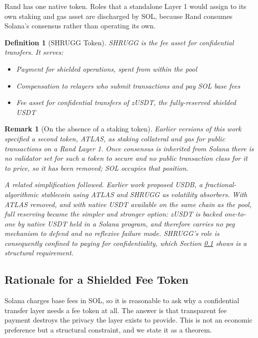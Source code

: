 \documentclass[11pt,a4paper]{article}
\newtheorem{definition}[theorem]{Definition}
\newtheorem{remark}[theorem]{Remark}
\begin{document}
Rand has one native token. Roles that a standalone Layer 1 would assign to its own staking and gas asset are discharged by SOL, because Rand consumes Solana's consensus rather than operating its own.

\begin{definition}[SHRUGG Token]
SHRUGG is the fee asset for confidential transfers. It serves:
\begin{itemize}
    \item Payment for shielded operations, spent from within the pool
    \item Compensation to relayers who submit transactions and pay SOL base fees
    \item Fee asset for confidential transfers of zUSDT, the fully-reserved shielded USDT \cite{zUSDTPaper}
\end{itemize}
\end{definition}

\begin{remark}[On the absence of a staking token]
Earlier versions of this work specified a second token, ATLAS, as staking collateral and gas for public transactions on a Rand Layer 1. Once consensus is inherited from Solana there is no validator set for such a token to secure and no public transaction class for it to price, so it has been removed; SOL occupies that position.

A related simplification followed. Earlier work proposed USDB, a fractional-algorithmic stablecoin using ATLAS and SHRUGG as volatility absorbers. With ATLAS removed, and with native USDT available on the same chain as the pool, full reserving became the simpler and stronger option: zUSDT \cite{zUSDTPaper} is backed one-to-one by native USDT held in a Solana program, and therefore carries no peg mechanism to defend and no reflexive failure mode. SHRUGG's role is consequently confined to paying for confidentiality, which Section \ref{sec:feetoken} shows is a structural requirement.
\end{remark}

\subsection{Rationale for a Shielded Fee Token}
\label{sec:feetoken}

Solana charges base fees in SOL, so it is reasonable to ask why a confidential transfer layer needs a fee token at all. The answer is that transparent fee payment destroys the privacy the layer exists to provide. This is not an economic preference but a structural constraint, and we state it as a theorem.
\end{document}
